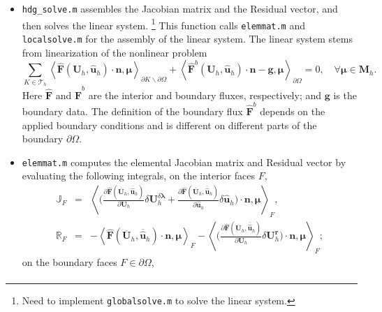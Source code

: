 \documentclass[11pt]{article}
\begin{document}
\begin{itemize}
\item \texttt{hdg\_solve.m} assembles the Jacobian matrix and the Residual vector, and then solves the linear system. \footnote{Need to implement \texttt{globalsolve.m} to solve the linear system.} This function calls \texttt{elemmat.m} and \texttt{localsolve.m} for the assembly of the linear system. The linear system stems from linearization of the nonlinear problem
\begin{equation}
\sum_{K \in \mathcal{T}_h}  \left\langle \bm{\widehat{F}} ({\bm{U}}_h,{\widehat{\bm{u}}}_h) \cdot \bm{n}, \bm{\mu} \right\rangle_{\partial K \backslash \partial \Omega} +  \left\langle \bm{\widehat{F}}^b({\bm{U}}_h,{\widehat{\bm{u}}}_h) \cdot \bm{n} - \bm{g}, \bm{\mu} \right\rangle_{\partial \Omega}  = 0, \quad \forall \bm{\mu} \in \bm{M}_h .
\end{equation}
Here $\bm{\widehat{F}}$ and $\bm{\widehat{F}}^b$ are the interior and boundary fluxes, respectively; and $\bm{g}$ is the boundary data. The definition of the boundary flux  $\bm{\widehat{F}}^b$ depends on the applied boundary conditions and is different on different parts of the boundary $\partial \Omega$.
\item \texttt{elemmat.m} computes the elemental Jacobian matrix and Residual vector by evaluating the following integrals, on the interior faces ${F}$,
\begin{equation}
\begin{array}{rcl}
\mathbb{J}_F & = & \displaystyle \left\langle \Big( \frac{\partial \bm{\widehat{F}}(\overline{\bm{U}}_h,\overline{\widehat{\bm{u}}}_h)}{\partial {\bm{U}}_h} \delta {\bm{U}}^{\delta \bm{\lambda}}_h + \frac{\partial \bm{\widehat{F}}(\overline{\bm{U}}_h,\overline{\widehat{\bm{u}}}_h)}{\partial \widehat{\bm{u}}_h} \delta \widehat{\bm{u}}_h  \Big) \cdot \bm{n}, \bm{\mu} \right\rangle_{F}, \\[3ex]
\mathbb{R}_F & = &  \displaystyle  -\left\langle \bm{\widehat{F}} (\overline{\bm{U}}_h,\overline{\widehat{\bm{u}}}_h) \cdot \bm{n}, \bm{\mu} \right\rangle_{F} - \left\langle \Big( \frac{\partial \bm{\widehat{F}}(\overline{\bm{U}}_h,\overline{\widehat{\bm{u}}}_h)}{\partial {\bm{U}}_h} \delta {\bm{U}}^{\bm{r}}_h  \Big) \cdot \bm{n}, \bm{\mu} \right\rangle_{F};
\end{array}
\end{equation}
on the boundary faces $F \in \partial \Omega$,
\begin{equation}
\begin{array}{rcl}

\end{array}
\end{equation}
\end{itemize}
\end{document}

